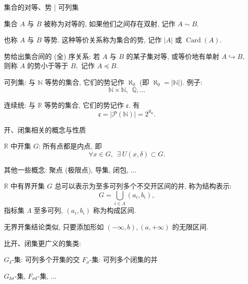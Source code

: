 
\begin{frame}{集合的对等、势 | 可列集}

\begin{Def}
集合 $A$ 与 $B$ 被称为\alert{对等}的, 如果他们之间存在\alert{双射}, 记作 $A \sim B.$

\pause

也称 $A$ 与 $B$ \alert{等势}. 这种等价关系称为集合的\alert{势}, 记作 $|A|$ 或 $\operatorname{Card}(A).$
\end{Def}

\pause

\begin{remark}
势给出集合间的 (全) 序关系: 若 $A$ 与 $B$ 的某子集对等, 或等价地有单射 $A \hookrightarrow B,$ 则称 $A$ 的势小于等于 $B,$ 记作 $A \preccurlyeq B.$
\end{remark}

可列集: 与 $\mathbb{N}$ 等势的集合, 它们的势记作 $\aleph_0$ (即 $\aleph_0 = |\mathbb{N}|$). 例子:
\[\mathbb{N} \times \mathbb{N}, ~~ \mathbb{Q}, \dots\]

\pause

连续统: 与 $\mathbb{R}$ 等势的集合, 它们的势记作 $\mathfrak{c}.$ 有
\[\mathfrak{c} = |\mathscr{P}(\mathbb{N})| = 2^{\aleph_0}.\]


\end{frame}


\begin{frame}{开、闭集相关的概念与性质}

$\mathbb{R}$ 中开集 $G$: 所有点都是内点, 即
\[\forall x \in G, ~~ \exists ~ U(x, \delta) \subset G.\]

\pause

其他一些概念: 聚点 (极限点), 导集, 闭包, $\dots$

\pause

\begin{thm}[开集结构性定理]
$\mathbb{R}$ 中有界开集 $G$ 总可以表示为至多可列多个不交开区间的并, 称为结构表示:
\[G = \bigcup_{i \in \Lambda} (a_i, b_i),\]
指标集 $\Lambda$ 至多可列, $(a_i, b_i)$ 称为构成区间.
\end{thm}

\pause

无界开集结论类似, 只要添加形如 $(-\infty, b), (a, +\infty)$ 的无限区间.

\pause
\vspace{0.8em}

比开、闭集更广义的集类:
\begin{center}
$G_{\delta}$-集: 可列多个开集的交 \quad\quad $F_{\sigma}$-集: 可列多个闭集的并

$G_{\delta\sigma}$-集, $F_{\sigma\delta}$-集, $\dots$
\end{center}

\end{frame}

